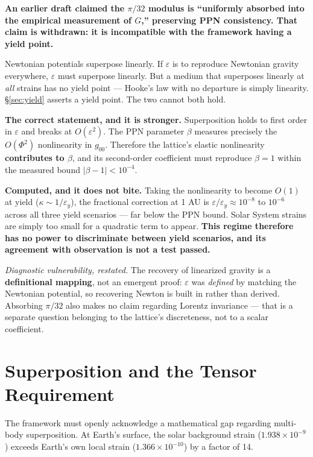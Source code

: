 \documentclass[11pt, letterpaper, openany]{book}
\begin{document}
\begin{correctionbox}
\textbf{An earlier draft claimed the $\pi/32$ modulus is ``uniformly absorbed into the empirical
measurement of $G$,'' preserving PPN consistency. That claim is withdrawn: it is incompatible with
the framework having a yield point.}

\medskip
Newtonian potentials superpose linearly. If $\varepsilon$ is to reproduce Newtonian gravity
everywhere, $\varepsilon$ must superpose linearly. But a medium that superposes linearly at
\emph{all} strains has no yield point --- Hooke's law with no departure is simply linearity.
\S\ref{sec:yield} asserts a yield point. The two cannot both hold.

\medskip
\textbf{The correct statement, and it is stronger.} Superposition holds to first order in
$\varepsilon$ and breaks at $O(\varepsilon^2)$. The PPN parameter $\beta$ measures precisely the
$O(\Phi^2)$ nonlinearity in $g_{00}$. Therefore the lattice's elastic nonlinearity
\textbf{contributes to $\beta$}, and its second-order coefficient must reproduce $\beta = 1$ within
the measured bound $|\beta - 1| < 10^{-4}$.

\medskip
\textbf{Computed, and it does not bite.} Taking the nonlinearity to become $O(1)$ at yield
($\kappa \sim 1/\varepsilon_y$), the fractional correction at 1 AU is $\varepsilon/\varepsilon_y
\approx 10^{-8}$ to $10^{-6}$ across all three yield scenarios --- far below the PPN bound. Solar
System strains are simply too small for a quadratic term to appear. \textbf{This regime therefore
has no power to discriminate between yield scenarios, and its agreement with observation is not a
test passed.}
\end{correctionbox}

\textit{Diagnostic vulnerability, restated.} The recovery of linearized gravity is a
\textbf{definitional mapping}, not an emergent proof: $\varepsilon$ was \emph{defined} by matching
the Newtonian potential, so recovering Newton is built in rather than derived. Absorbing $\pi/32$
also makes no claim regarding Lorentz invariance --- that is a separate question belonging to the
lattice's discreteness, not to a scalar coefficient.

\section{Superposition and the Tensor Requirement}

The framework must openly acknowledge a mathematical gap regarding multi-body superposition. At Earth's surface, the solar background strain ($1.938 \times 10^{-9}$) exceeds Earth's own local strain ($1.366 \times 10^{-10}$) by a factor of 14. 
\end{document}
